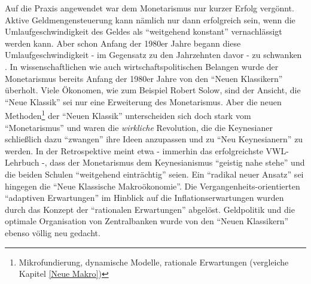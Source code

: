 Auf die Praxis angewendet war dem Monetarismus nur kurzer Erfolg vergönnt. Aktive Geldmengensteuerung kann nämlich nur dann erfolgreich sein, wenn die Umlaufgeschwindigkeit des Geldes als "`weitgehend konstant"' vernachlässigt werden kann. Aber schon Anfang der 1980er Jahre begann diese Umlaufgeschwindigkeit - im Gegensatz zu den Jahrzehnten davor - zu schwanken \parencite[S. 703]{Samuelson1998}. In wissenschaftlichen wie auch wirtschaftspolitischen Belangen wurde der Monetarismus bereits Anfang der 1980er Jahre von den "`Neuen Klassikern"' überholt. Viele Ökonomen, wie zum Beispiel Robert Solow, sind der Ansicht, die "`Neue Klassik"' sei nur eine Erweiterung des Monetarismus\parencite[S.342]{Warsh}. Aber die neuen Methoden\footnote{Mikrofundierung, dynamische Modelle, rationale Erwartungen (vergleiche Kapitel \ref{Neue Makro})} der "`Neuen Klassik"' unterscheiden sich doch stark vom "`Monetarismus"' und waren die \textit{wirkliche} Revolution, die die Keynesianer schließlich dazu "`zwangen"' ihre Ideen anzupassen und zu "`Neu Keynesianern"' zu werden. In der Retrospektive meint etwa \textcite[S. 697]{Samuelson1998} - immerhin das erfolgreichste VWL-Lehrbuch -, dass der Monetarismus dem Keynesianismus "`geistig nahe stehe"' und die beiden Schulen "`weitgehend einträchtig"' \parencite[S. 702]{Samuelson1998} seien. Ein "`radikal neuer Ansatz"'\parencite[S. 704]{Samuelson1998} sei hingegen die "`Neue Klassische Makroökonomie"'. Die Vergangenheits-orientierten "`adaptiven Erwartungen"' im Hinblick auf die Inflationserwartungen wurden durch das Konzept der "`rationalen Erwartungen"' abgelöst. Geldpolitik und die optimale Organisation von Zentralbanken wurde von den "`Neuen Klassikern"' ebenso völlig neu gedacht. 

